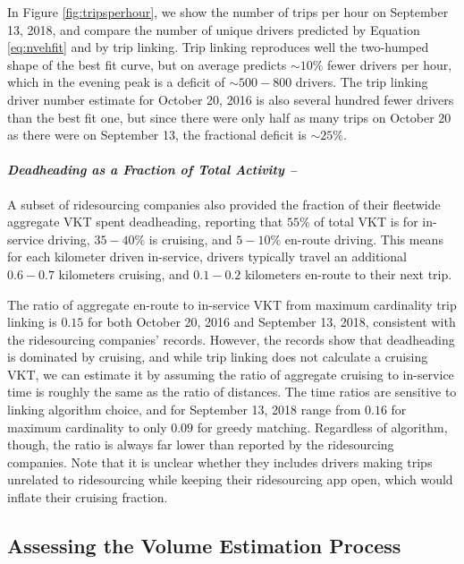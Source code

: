 \documentclass[]{trbunofficial_bdit_final}
\begin{document}
In Figure \ref{fig:tripsperhour}, we show the number of trips per hour on September
13, 2018, and compare the number of unique drivers predicted by Equation
\ref{eq:nvehfit} and by trip linking. Trip linking reproduces well the two-humped
shape of the best fit curve, but on average predicts \(\sim10\%\) fewer drivers
per hour, which in the evening peak is a deficit of \(\sim500 - 800\) drivers.
The trip linking driver number estimate for October 20, 2016 is also several
hundred fewer drivers than the best fit one, but since there were only half as
many trips on October 20 as there were on September 13, the fractional deficit
is \(\sim25\%\).

\hypertarget{deadheading-as-a-fraction-of-total-activity}{%
\paragraph{\texorpdfstring{\emph{Deadheading as a Fraction of Total Activity --}}{Deadheading as a Fraction of Total Activity --}}\label{deadheading-as-a-fraction-of-total-activity}}

A subset of ridesourcing companies also provided the fraction of their
fleetwide aggregate VKT spent deadheading, reporting that \(55\%\) of total VKT
is for in-service driving, \(35-40\%\) is cruising, and \(5-10\%\) en-route
driving. This means for each kilometer driven in-service, drivers typically
travel an additional \(0.6 - 0.7\) kilometers cruising, and \(0.1 - 0.2\)
kilometers en-route to their next trip.

The ratio of aggregate en-route to in-service VKT from maximum cardinality trip
linking is \(0.15\) for both October 20, 2016 and September 13, 2018, consistent
with the ridesourcing companies' records. However, the records show that
deadheading is dominated by cruising, and while trip linking does not calculate
a cruising VKT, we can estimate it by assuming the ratio of aggregate cruising
to in-service time is roughly the same as the ratio of distances. The
time ratios are sensitive to linking algorithm choice, and for September
13, 2018 range from \(0.16\) for maximum cardinality to only \(0.09\) for greedy
matching. Regardless of algorithm, though, the ratio is always far lower
than reported by the ridesourcing companies. Note that it is unclear whether
they includes drivers making trips unrelated to ridesourcing while keeping
their ridesourcing app open, which would inflate their cruising fraction.

\hypertarget{sec:assessment}{%
\subsection{Assessing the Volume Estimation Process}\label{sec:assessment}}
\end{document}
